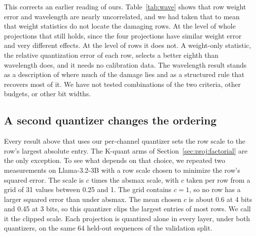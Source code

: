 \documentclass[10pt]{article}
\begin{document}
This corrects an earlier reading of ours. Table~\ref{tab:wave} shows that row weight error and
wavelength are nearly uncorrelated, and we had taken that to mean that weight statistics do not
locate the damaging rows. At the level of whole projections that still holds, since the four
projections have similar weight error and very different effects. At the level of rows it does
not. A weight-only statistic, the relative quantization error of each row, selects a better eighth
than wavelength does, and it needs no calibration data. The wavelength result stands as a
description of where much of the damage lies and as a structured rule that recovers most of it.
We have not tested combinations of the two criteria, other budgets, or other bit widths.

\subsection{A second quantizer changes the ordering}\label{sec:proj:quant}

Every result above that uses our per-channel quantizer sets the row scale to the row's
largest absolute entry. The K-quant arms of Section~\ref{sec:proj:factorial} are the only
exception. To
see what depends on that choice, we repeated two measurements on Llama-3.2-3B with a row scale
chosen to minimize the row's squared error. The scale is $c$ times the absmax scale, with $c$
taken per row from a grid of 31 values between 0.25 and 1. The grid contains $c = 1$, so no row
has a larger squared error than under absmax. The mean chosen $c$ is about 0.6 at 4 bits and
0.45 at 3 bits, so this quantizer clips the largest entries of most rows. We call it the clipped
scale. Each projection is quantized alone in every layer, under both quantizers, on the same 64
held-out sequences of the validation split.
\end{document}
